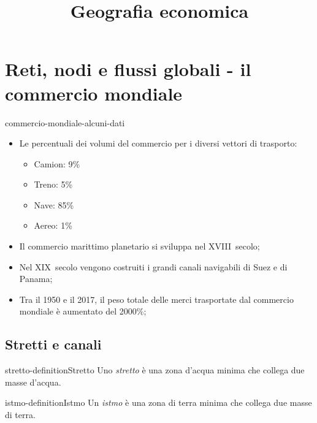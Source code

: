 \documentclass[preview]{standalone}
\begin{document}
\title{Geografia economica}
\genpage

\section{Reti, nodi e flussi globali - il commercio mondiale}

\begin{snippet}{commercio-mondiale-alcuni-dati}
    \vspace*{-0.25cm}
    \begin{itemize}
        \item Le percentuali dei volumi del commercio per i diversi vettori di trasporto:
            \begin{itemize}
                \item Camion: 9\%
                \item Treno: 5\%
                \item Nave: 85\%
                \item Aereo: 1\%
            \end{itemize}
        \item Il commercio marittimo planetario si sviluppa nel XVIII\textdegree\, secolo;
        \item Nel XIX\textdegree\, secolo vengono costruiti i grandi canali navigabili di Suez e di
            Panama;
        \item Tra il 1950 e il 2017, il peso totale delle merci trasportate dal commercio mondiale
            è aumentato del 2000\%;
    \end{itemize} 
\end{snippet}

\subsection{Stretti e canali}

\begin{snippetdefinition}{stretto-definition}{Stretto}
    Uno \textit{stretto} è una zona d'acqua minima che collega due masse d'acqua.
\end{snippetdefinition}

\begin{snippetdefinition}{istmo-definition}{Istmo}
    Un \textit{istmo} è una zona di terra minima che collega due masse di terra.
\end{snippetdefinition}
\end{document}
